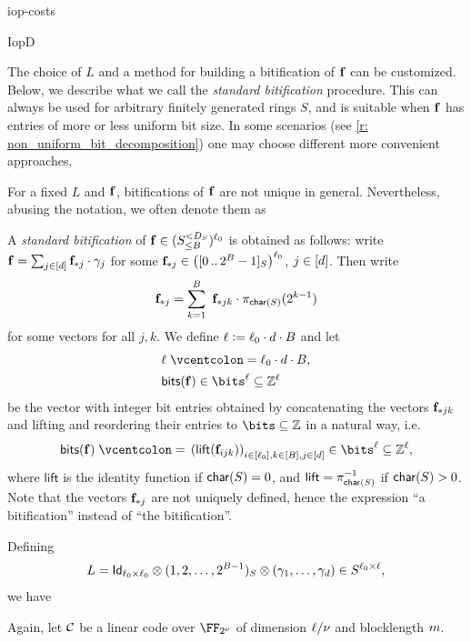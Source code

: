 \begin{lncsappendix}{iop-costs}
\begin{lncsmove}{IopD}
\begin{definition}
The choice of $L$ and a method for building a bitification of $\mathbf{f}$  can be customized. Below, we describe what we call the \emph{standard bitification} procedure. This can always be used for arbitrary finitely generated rings $S$, and is suitable when $\mathbf{f}$ has entries of more or less uniform bit size.  In some scenarios (see \cref{r: non_uniform_bit_decomposition}) one may choose different more convenient approaches.

For a fixed $L$ and $\mathbf{f}$, bitifications of $\mathbf{f}$ are not unique in general. Nevertheless, abusing the notation, we often denote them as  
%

A \emph{standard bitification} of $\mathbf{f}\in ({S_{\leq B}^{<D_S}})^{\ell_0}
$ is obtained as follows: write
$\mathbf{f}=\sum_{j\in [d]} \mathbf{f}_{*j}\cdot \gamma_j$
for some $\mathbf{f}_{*j}\in \left([0 \, .. \, 2^B-1]_S\right)^{\ell_0}$, $j\in [d]$.  Then write $$\mathbf{f}_{*j}= \sum_{k=1}^{B}\  \mathbf{f}_{*jk}\cdot \pi_{\mathsf{char}(S)}(2^{k-1}) $$ for some vectors  for all $j,k$.  We  define  
\iflncs 
$\ell{\;\vcentcolon=\;} \ell_0\cdot d\cdot B$ and let
\lncsmath{
\bitstext(\bff)\in \bits^{\codedim} \subseteq \ZZ^{\codedim}
}
\else
$$
\begin{aligned}
& \codedim\defeq \codedim_0\cdot \moduledegree\cdot B,\\
&\bitstext(\bff)\in \bits^{\codedim} \subseteq \ZZ^{\codedim}\end{aligned}$$
\fi be the vector with integer bit entries obtained by concatenating the vectors $\mathbf{f}_{*jk}$ and lifting and reordering their entries to $\bits \subseteq \ZZ$ in a natural way, i.e.\ \begin{equation}\label{e:bits_of_f}\bitstext(\bff)\defeq \left(\mathsf{lift}(\bff_{ijk})\right)_{i\in [\codedim_0], k\in [B], j\in [\moduledegree]}\in \bits^{\codedim} \subseteq \ZZ^{\codedim},\end{equation}
where $\mathsf{lift}$ is the identity function if $\mathsf{char}(S)=0$,  and  $\mathsf{lift} = \pi_{\mathsf{char}(S)}^{-1}$ if $\mathsf{char}(S)>0$.  Note that the vectors $\mathbf{f}_{*j}$ are not uniquely defined, hence the expression ``a bitification'' instead of ``the bitification''. 

Defining 
$$L=\mathsf{Id}_{\ell_0\times \ell_0} \otimes (1, 2, \ldots, 2^{B-1})_S \otimes (\gamma_1, \ldots, \gamma_d) \in S^{\ell_0\times \ell},$$
we have
\end{definition}
%
%
Again, let $\mathcal{C}$ be a linear code over $\comfield$ of dimension $\ell/\nu$ and blocklength $m$. 



\end{lncsmove}
\end{lncsappendix}
